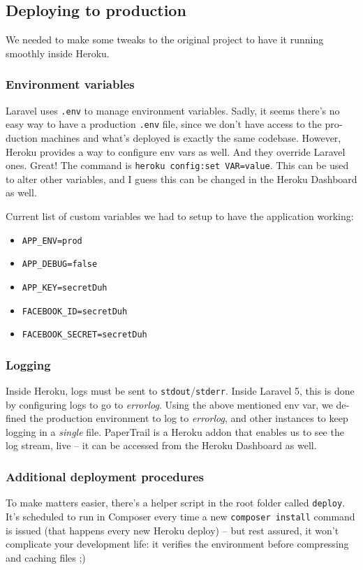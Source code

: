 \documentclass[12pt,a4paper,twoside,hyphens,english,brazil]{abntex2}
\begin{document}
{\begin{otherlanguage}{english}
\subsection{Deploying to production}
We needed to make some tweaks to the original project to have it running smoothly inside Heroku.

\subsubsection{Environment variables}
Laravel uses \texttt{.env} to manage environment variables. Sadly, it seems there's no easy way to have a production \texttt{.env} file, since we don't have access to the production machines and what's deployed is exactly the same codebase. However, Heroku provides a way to configure env vars as well. And they override Laravel ones. Great! The command is \texttt{heroku config:set VAR=value}. This can be used to alter other variables, and I guess this can be changed in the Heroku Dashboard as well.

Current list of custom variables we had to setup to have the application working:

\begin{itemize}[itemsep=-1ex]
	\item \texttt{APP\_ENV=prod}
	\item \texttt{APP\_DEBUG=false}
	\item \texttt{APP\_KEY=secretDuh}
	\item \texttt{FACEBOOK\_ID=secretDuh}
	\item \texttt{FACEBOOK\_SECRET=secretDuh}
\end{itemize}

\subsubsection{Logging}
Inside Heroku, logs must be sent to \texttt{stdout}/\texttt{stderr}. Inside Laravel 5, this is done by configuring logs to go to \emph{errorlog}. Using the above mentioned env var, we defined the production environment to log to \emph{errorlog}, and other instances to keep logging in a \emph{single} file. PaperTrail is a Heroku addon that enables us to see the log stream, live -- it can be accessed from the Heroku Dashboard as well.

\subsubsection{Additional deployment procedures}
To make matters easier, there's a helper script in the root folder called \texttt{deploy}. It's scheduled to run in Composer every time a new \texttt{composer install} command is issued (that happens every new Heroku deploy) -- but rest assured, it won't complicate your development life: it verifies the environment before compressing and caching files ;)


\end{otherlanguage}}
\end{document}
